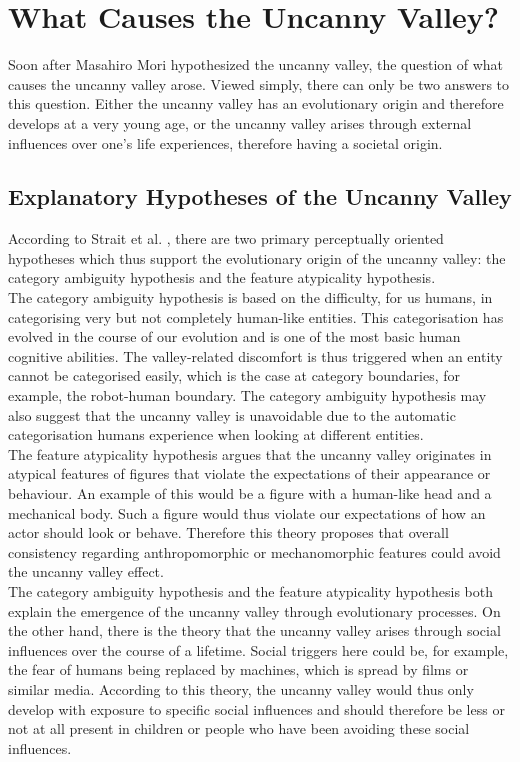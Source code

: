 \chapter{What Causes the Uncanny Valley?}   
Soon after Masahiro Mori hypothesized the uncanny valley, the question of what causes the uncanny valley arose. Viewed simply, there can only be two answers to this question. Either the uncanny valley has an evolutionary origin and therefore develops at a very young age, or the uncanny valley arises through external influences over one's life experiences, therefore having a societal origin. 
\section{Explanatory Hypotheses of the Uncanny Valley}
According to Strait et al. \cite{childrens_responding}, there are two primary perceptually oriented hypotheses which thus support the evolutionary origin of the uncanny valley: the category ambiguity hypothesis and the feature atypicality hypothesis.\\
The category ambiguity hypothesis \cite{childrens_responding} is based on the difficulty, for us humans, in categorising very but not completely human-like entities. This categorisation has evolved in the course of our evolution and is one of the
most basic human cognitive abilities. The valley-related discomfort is thus triggered when an entity cannot be categorised easily, which is the case at category boundaries, for example, the robot-human boundary. The category ambiguity hypothesis may also suggest that the uncanny valley is unavoidable due to the automatic categorisation humans experience when looking at different entities.\\
The feature atypicality hypothesis \cite{childrens_responding} argues that the uncanny valley originates in atypical features of figures that violate the expectations of their appearance or behaviour. An example of this would be a figure with a human-like head and a mechanical body. Such a figure would thus violate our expectations of how an actor should look or behave. Therefore this theory proposes that overall consistency regarding anthropomorphic or mechanomorphic features could avoid the uncanny valley effect.\\
The category ambiguity hypothesis and the feature atypicality hypothesis both explain the emergence of the uncanny valley through evolutionary processes. On the other hand, there is the theory that the uncanny valley arises through social influences over the course of a lifetime. Social triggers here could be, for example, the fear of humans being replaced by machines, which is spread by films or similar media. According to this theory, the uncanny valley would thus only develop with exposure to specific social influences and should therefore be less or not at all present in children or people who have been avoiding these social influences. 
